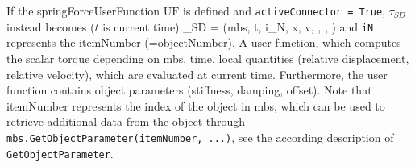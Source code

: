     If the springForceUserFunction $\mathrm{UF}$ is defined and \texttt{activeConnector = True}, 
	$\tau_{SD}$ instead becomes ($t$ is current time)
    \be
      \tau_{SD} = (mbs, t, i_N, \Delta x, \Delta v, , , )
    \ee
    and \texttt{iN} represents the itemNumber (=objectNumber).
    A user function, which computes the scalar torque depending on mbs, time, local quantities 
	(relative displacement, relative velocity), which are evaluated at current time. 
	Furthermore, the user function contains object parameters (stiffness, damping, offset).
    Note that itemNumber represents the index of the object in mbs, which can be used to retrieve additional data from the object through
    \texttt{mbs.GetObjectParameter(itemNumber, ...)}, see the according description of \texttt{GetObjectParameter}.
    
